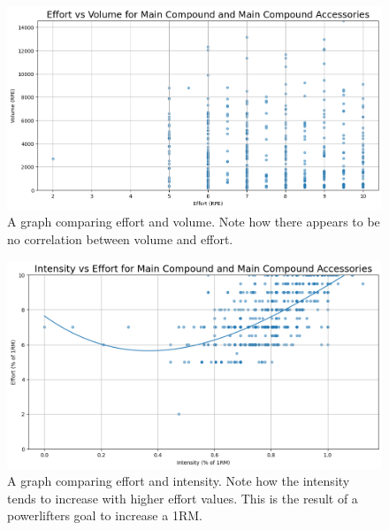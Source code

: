 \begin{figure}
    \centering
    \includegraphics[scale=0.55]{images/ch3/EffortVsVolume.png}
    \caption{A graph comparing effort and volume. Note how there appears to be no correlation between volume and effort.}
    \label{fig:EffortVsVolumeGraph}
\end{figure}
\begin{figure}
    \centering
    \includegraphics[scale=0.55]{images/ch3/IntensityVsEffort.png}
    \caption{A graph comparing effort and intensity. Note how the intensity tends to increase with higher effort values. This is the result of a powerlifters goal to increase a 1RM.}
    \label{fig:EffortVsIntensity}
\end{figure}

